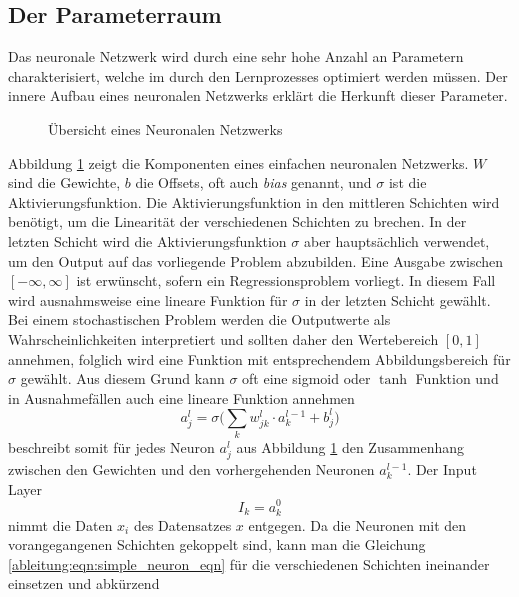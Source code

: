 \subsection{Der Parameterraum}
Das neuronale Netzwerk wird durch eine sehr hohe Anzahl an Parametern charakterisiert, welche im durch den Lernprozesses optimiert werden müssen. Der innere Aufbau eines neuronalen Netzwerks erklärt die Herkunft dieser Parameter.
\begin{figure}
	\begin{center}
		
		\caption{Übersicht eines Neuronalen Netzwerks}
		\label{ableitung:fig:neuronal_network}
	\end{center}
\end{figure} 
Abbildung \ref{ableitung:fig:neuronal_network} zeigt die Komponenten eines einfachen neuronalen Netzwerks. $W$ sind die Gewichte, $b$ die Offsets, oft auch \textit{bias} genannt, und $\sigma$ ist die Aktivierungsfunktion. Die Aktivierungsfunktion in den mittleren Schichten wird benötigt, um die Linearität der verschiedenen Schichten zu brechen. In der letzten Schicht wird die Aktivierungsfunktion $\sigma$ aber hauptsächlich verwendet, um den Output auf das vorliegende Problem abzubilden. Eine Ausgabe zwischen $[-\infty, \infty]$ ist erwünscht, sofern ein Regressionsproblem vorliegt. In diesem Fall wird ausnahmsweise eine lineare Funktion für $\sigma$ in der letzten Schicht gewählt. Bei einem stochastischen Problem werden die Outputwerte als Wahrscheinlichkeiten interpretiert und sollten daher den Wertebereich $[0,1]$ annehmen, folglich wird eine Funktion mit entsprechendem Abbildungsbereich für $\sigma$ gewählt. Aus diesem Grund kann $\sigma$ oft eine  sigmoid oder $\tanh$ Funktion und in Ausnahmefällen auch eine lineare Funktion annehmen
\begin{equation}
a^{l}_{j} = \sigma \biggl( \sum\limits_{k}w^{l}_{jk} \cdot a^{l-1}_{k}+b^{l}_{j} \biggr)
\label{ableitung:eqn:simple_neuron_eqn}
\end{equation}
beschreibt somit für jedes Neuron $a^{l}_{j}$ aus Abbildung \ref{ableitung:fig:neuronal_network} den Zusammenhang zwischen den Gewichten und den vorhergehenden Neuronen $a^{l-1}_{k}$. Der Input Layer 
\begin{equation}
I_k = a_{k}^{0}
\end{equation}
nimmt die Daten $x_i$ des Datensatzes $x$ entgegen.
Da die Neuronen mit den vorangegangenen Schichten gekoppelt sind, kann man die Gleichung \eqref{ableitung:eqn:simple_neuron_eqn} für die verschiedenen Schichten ineinander einsetzen und abkürzend
